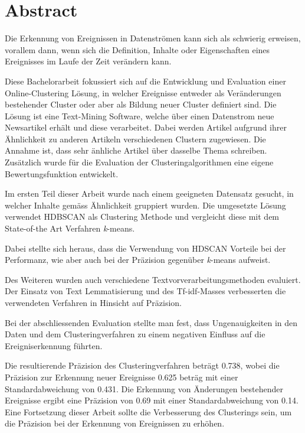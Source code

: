 
\section*{Abstract}

Die Erkennung von Ereignissen in Datenströmen kann sich als schwierig erweisen, vorallem dann,
wenn sich die Definition, Inhalte oder Eigenschaften eines Ereignisses im Laufe der Zeit verändern kann.

Diese Bachelorarbeit fokussiert sich auf die Entwicklung und Evaluation einer Online-Clustering Lösung,
in welcher Ereignisse entweder als Veränderungen bestehender Cluster oder aber als Bildung neuer Cluster
definiert sind.
Die Lösung ist eine Text-Mining Software, welche über einen Datenstrom neue Newsartikel erhält
und diese verarbeitet.
Dabei werden Artikel aufgrund ihrer Ähnlichkeit zu anderen Artikeln verschiedenen Clustern zugewiesen.
Die Annahme ist, dass sehr änhliche Artikel über dasselbe Thema schreiben.
Zusätzlich wurde für die Evaluation der Clusteringalgorithmen eine eigene Bewertungsfunktion entwickelt.

Im ersten Teil dieser Arbeit wurde nach einem geeigneten Datensatz gesucht,
in welcher Inhalte gemäss Ähnlichkeit gruppiert wurden.
Die umgesetzte Lösung verwendet HDBSCAN als Clustering Methode und vergleicht diese
mit dem State-of-the Art Verfahren \textit{k}-means.

Dabei stellte sich heraus, dass die Verwendung von HDSCAN Vorteile bei der Performanz,
wie aber auch bei der Präzision gegenüber \textit{k}-means aufweist.

Des Weiteren wurden auch verschiedene Textvorverarbeitungsmethoden evaluiert.
Der Einsatz von Text Lemmatisierung und des Tf-idf-Masses verbesserten
die verwendeten Verfahren in Hinsicht auf Präzision.

Bei der abschliessenden Evaluation stellte man fest,
dass Ungenauigkeiten in den Daten und dem Clusteringverfahren
zu einem negativen Einfluss auf die Ereigniserkennung führten.

Die resultierende Präzision des Clusteringverfahren beträgt 0.738, 
wobei die Präzision zur Erkennung neuer Ereignisse 0.625 beträg mit einer Standardabweichung von 0.431.
Die Erkennung von Änderungen bestehender Ereignisse ergibt eine Präzision von 0.69 mit einer Standardabweichung von 0.14.
Eine Fortsetzung dieser Arbeit sollte die Verbesserung des Clusterings sein,
um die Präzision bei der Erkennung von Ereignissen zu erhöhen.
